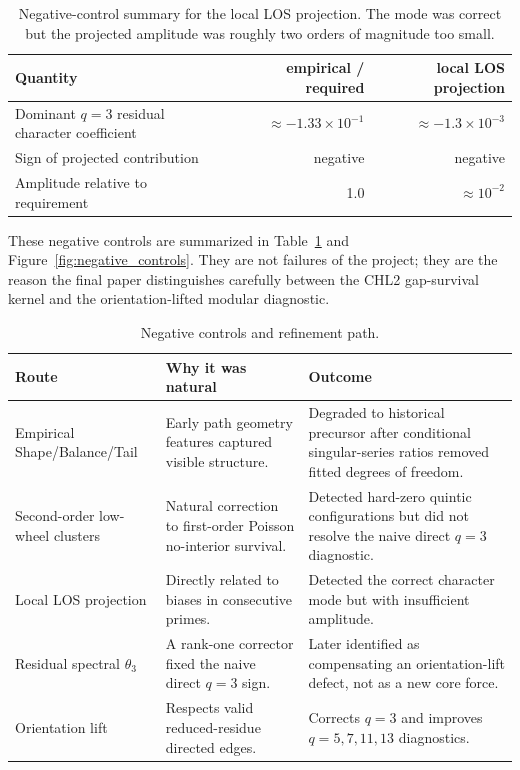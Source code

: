 \documentclass[10pt]{article}
\begin{document}
\begin{table}[H]\centering\small
\begin{tabular}{lrr}
\toprule
Quantity & empirical / required & local LOS projection \\
\midrule
Dominant $q=3$ residual character coefficient & $\approx -1.33\times10^{-1}$ & $\approx -1.3\times10^{-3}$ \\
Sign of projected contribution & negative & negative \\
Amplitude relative to requirement & 1.0 & $\approx 10^{-2}$ \\
\bottomrule
\end{tabular}
\caption{Negative-control summary for the local LOS projection.  The mode was correct but the projected amplitude was roughly two orders of magnitude too small.}
\end{table}

These negative controls are summarized in Table~\ref{tab:negative_controls} and Figure~\ref{fig:negative_controls}.  They are not failures of the project; they are the reason the final paper distinguishes carefully between the CHL2 gap-survival kernel and the orientation-lifted modular diagnostic.

\begin{table}[H]\centering\small
\begin{tabularx}{\textwidth}{lXX}
\toprule
Route & Why it was natural & Outcome \\
\midrule
Empirical Shape/Balance/Tail & Early path geometry features captured visible structure. & Degraded to historical precursor after conditional singular-series ratios removed fitted degrees of freedom. \\
Second-order low-wheel clusters & Natural correction to first-order Poisson no-interior survival. & Detected hard-zero quintic configurations but did not resolve the naive direct $q=3$ diagnostic. \\
Local LOS projection & Directly related to biases in consecutive primes. & Detected the correct character mode but with insufficient amplitude. \\
Residual spectral $\theta_3$ & A rank-one corrector fixed the naive direct $q=3$ sign. & Later identified as compensating an orientation-lift defect, not as a new core force. \\
Orientation lift & Respects valid reduced-residue directed edges. & Corrects $q=3$ and improves $q=5,7,11,13$ diagnostics. \\
\bottomrule
\end{tabularx}
\caption{Negative controls and refinement path.}\label{tab:negative_controls}
\end{table}
\end{document}

